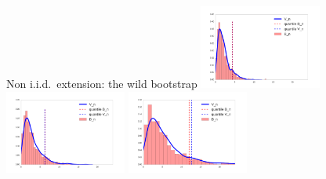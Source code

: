 \begin{frame}
\begin{columns}
\begin{column}{.33\linewidth}
\begin{block}{Non i.i.d.\ extension: the wild bootstrap}
 \includegraphics[width=0.3\textwidth]{../../presentation/img/bootstrapWorks1.pdf}
 \includegraphics[width=0.3\textwidth]{../../presentation/img/bootstrapWorks4.pdf}
 \includegraphics[width=0.3\textwidth]{../../presentation/img/bootstrapWorks7.pdf}
\end{block}
\end{column}



\end{columns}
\end{frame}
